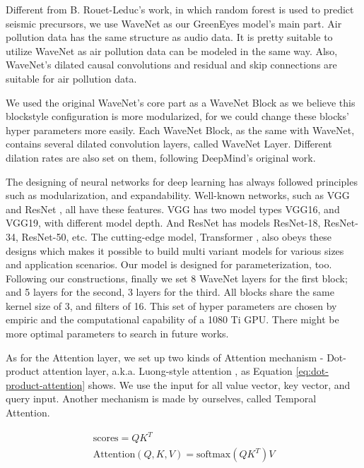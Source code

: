 \documentclass[
twocolumn,
]{ceurart}
\begin{document}
Different from B. Rouet-Leduc's work\cite{rouet2017machine}, in which random forest is used to predict seismic precursors, we use WaveNet as our GreenEyes model's main part. Air pollution data has the same structure as audio data. It is pretty suitable to utilize WaveNet as air pollution data can be modeled in the same way. Also, WaveNet's dilated causal convolutions and residual and skip connections are suitable for air pollution data.

We used the original WaveNet's core part as a WaveNet Block as we believe this block\-style configuration is more modularized, for we could change these blocks' hyper parameters more easily. Each WaveNet Block, as the same with WaveNet, contains several dilated convolution layers, called WaveNet Layer. Different dilation rates are also set on them, following DeepMind's original work. 

The designing of neural networks for deep learning has always followed principles such as modularization, and expandability. Well-known networks, such as VGG \cite{simonyan2014very} and ResNet \cite{he2016deep}, all have these features. VGG has two model types VGG16, and VGG19, with different model depth. And ResNet has models ResNet-18, ResNet-34, ResNet-50, etc. The cutting-edge model, Transformer \cite{vaswani2017attention}, also obeys these designs which makes it possible to build multi variant models for various sizes and application scenarios. Our model is designed for parameterization, too. Following our constructions, finally we set 8 WaveNet layers for the first block; and 5 layers for the second, 3 layers for the third. All blocks share the same kernel size of 3, and filters of 16. This set of hyper parameters are chosen by empiric and the computational capability of a 1080 Ti GPU. There might be more optimal parameters to search in future works.

As for the Attention layer, we set up two kinds of Attention mechanism - Dot-product attention layer, a.k.a. Luong-style attention \cite{luong2015effective}, as Equation \ref{eq:dot-product-attention} shows. We use the input for all value vector, key vector, and query input. Another mechanism is made by ourselves, called Temporal Attention. 

\begin{gather}
    \text{scores}=QK^T \\
    \text{Attention}(Q, K, V ) = \text{softmax}(QK^T)V
    \label{eq:dot-product-attention}
\end{gather}
\end{document}

